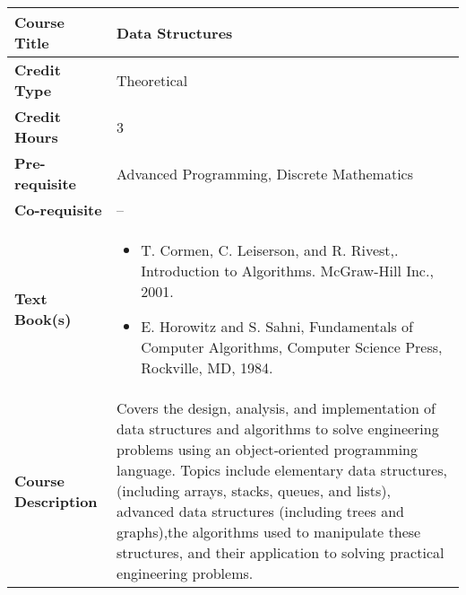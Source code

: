 \documentclass[11pt]{article}
\begin{document}
\begin{table}[h!]
\begin{tabular}{|l|l|}
\hline
\textbf{Course Title}       &  Data Structures \\ \hline
\textbf{Credit Type}        &  Theoretical \\ \hline
\textbf{Credit Hours}       & 3 \\ \hline
\textbf{Pre-requisite}       & Advanced Programming, Discrete Mathematics \\ \hline
\textbf{Co-requisite}       & -- \\ \hline
\textbf{Text Book(s)}       & \begin{minipage}{.70\textwidth}
\begin{itemize} \itemsep-0.4em
	\vspace{3mm}
	\item T. Cormen, C. Leiserson, and R. Rivest,. Introduction to Algorithms. McGraw-Hill Inc., 2001.
           \item E. Horowitz and S. Sahni, Fundamentals of Computer Algorithms, Computer Science Press, Rockville, MD, 1984.
	\vspace{3mm}
\end{itemize}
\end{minipage}\\ \hline
\textbf{Course Description} & \begin{minipage}{.70\textwidth}
\vspace{3mm}
Covers the design, analysis, and implementation of data structures and algorithms to solve engineering
problems using an object‐oriented programming language. Topics include elementary data structures,
(including arrays, stacks, queues, and lists), advanced data structures (including trees and graphs),the
algorithms used to manipulate these structures, and their application to solving practical engineering
problems.
\vspace{3mm}
\end{minipage} \\ \hline
\end{tabular}
\end{table}
\end{document}
